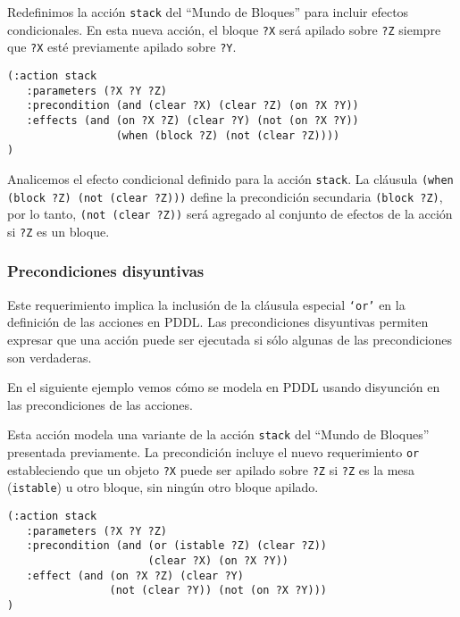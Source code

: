	\begin{ejemplo}%
	
	Redefinimos la acci\'on \texttt{stack} del ``Mundo de Bloques''
	para incluir efectos condicionales. En esta nueva acci\'on,
        el bloque \texttt{?X} ser\'a apilado sobre \texttt{?Z}
        siempre que \texttt{?X} est\'e previamente apilado sobre
        \texttt{?Y}.
	
	\begin{verbatim}
(:action stack
   :parameters (?X ?Y ?Z)
   :precondition (and (clear ?X) (clear ?Z) (on ?X ?Y))
   :effects (and (on ?X ?Z) (clear ?Y) (not (on ?X ?Y)) 
                 (when (block ?Z) (not (clear ?Z))))
)
	\end{verbatim}

        Analicemos el efecto condicional
        definido para la acci\'on \texttt{stack}. La cl\'ausula \texttt{(when (block ?Z) (not (clear ?Z)))}
        define la precondici\'on secundaria \texttt{(block ?Z)},
        por lo tanto, \texttt{(not (clear ?Z))} ser\'a agregado 
        al conjunto de efectos de la acci\'on si \texttt{?Z} es un
        bloque. 
	\end{ejemplo}
	


	\subsubsection{Precondiciones disyuntivas}
	
	Este requerimiento implica la inclusi\'on de la cl\'ausula
	especial \texttt{`or'} en la definici\'on 
	de las acciones en PDDL. Las precondiciones disyuntivas 
        permiten expresar que una acci\'on puede ser ejecutada si s\'olo 
        algunas de las precondiciones son verdaderas.

	En el siguiente ejemplo vemos c\'omo se modela en PDDL
        usando disyunci\'on en las precondiciones de las acciones.
	
	\begin{ejemplo}%
	
	Esta acci\'on modela una variante de la acci\'on
	\texttt{stack} del ``Mundo de Bloques'' presentada
	previamente. 
        La precondici\'on incluye el nuevo requerimiento \texttt{or} 
        estableciendo que un objeto \texttt{?X} puede ser apilado sobre
	\texttt{?Z} si \texttt{?Z} es la mesa (\texttt{istable}) u 
        otro bloque, sin ning\'un otro bloque apilado.
	
	\begin{verbatim}		  
(:action stack
   :parameters (?X ?Y ?Z)
   :precondition (and (or (istable ?Z) (clear ?Z))
                      (clear ?X) (on ?X ?Y))
   :effect (and (on ?X ?Z) (clear ?Y)
                (not (clear ?Y)) (not (on ?X ?Y)))
)	
	\end{verbatim}
	\end{ejemplo}
	  

